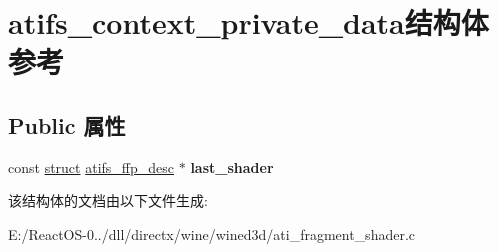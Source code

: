 \hypertarget{structatifs__context__private__data}{}\section{atifs\+\_\+context\+\_\+private\+\_\+data结构体 参考}
\label{structatifs__context__private__data}
\subsection*{Public 属性}
\begin{DoxyCompactItemize}
\item 
\mbox{\label{structatifs__context__private__data_ae1544a7a582a8fc9c63e668388fdce49}} 
const \hyperlink{interfacestruct}{struct} \hyperlink{structatifs__ffp__desc}{atifs\+\_\+ffp\+\_\+desc} $\ast$ {\bfseries last\+\_\+shader}
\end{DoxyCompactItemize}


该结构体的文档由以下文件生成\+:\begin{DoxyCompactItemize}
\item 
E\+:/\+React\+O\+S-\/0../dll/directx/wine/wined3d/ati\+\_\+fragment\+\_\+shader.\+c\end{DoxyCompactItemize}
